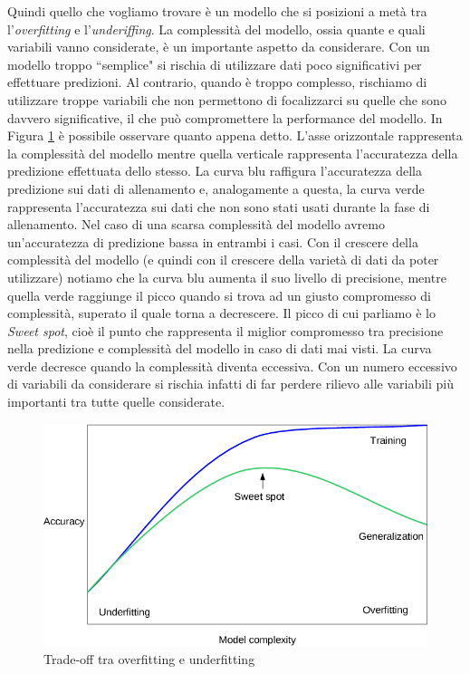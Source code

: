 \documentclass[12pt,italian]{report}
\begin{document}
Quindi quello che vogliamo trovare è un modello che si posizioni a metà tra l'\emph{overfitting} e l'\emph{underiffing}. La complessità del modello, ossia quante e quali variabili vanno considerate, è un importante aspetto da considerare. Con un modello troppo ``semplice" si rischia di utilizzare dati poco significativi per effettuare predizioni. %
Al contrario, quando è troppo complesso, rischiamo di utilizzare troppe variabili che non permettono di focalizzarci su quelle che sono davvero significative, il che può compromettere la performance del modello. In Figura \ref{fig:tradeoff_img} è possibile osservare quanto appena detto. L'asse orizzontale rappresenta la complessità del modello mentre quella verticale rappresenta l'accuratezza della predizione effettuata dello stesso. La curva blu raffigura l'accuratezza della predizione sui dati di allenamento e, analogamente a questa, la curva verde rappresenta l'accuratezza sui dati che non sono stati usati durante la fase di allenamento. Nel caso di una scarsa complessità del modello avremo un'accuratezza di predizione bassa in entrambi i casi. Con il crescere della complessità del modello (e quindi con il crescere della varietà di dati da poter utilizzare) notiamo che la curva blu aumenta il suo livello di precisione, mentre quella verde raggiunge il picco quando si trova ad un giusto compromesso di complessità, superato il quale torna a decrescere. Il picco di cui parliamo è lo \emph{Sweet spot}, cioè il punto che rappresenta il miglior compromesso tra precisione nella predizione e complessità del modello in caso di dati mai visti. La curva verde decresce quando la complessità diventa eccessiva. Con un numero eccessivo di variabili da considerare si rischia infatti di far perdere rilievo alle variabili più importanti tra tutte quelle considerate.%

\begin{figure} [h!]


	\includegraphics[scale=0.5]{../img/tradeoff_overfitting_underfitting.png}
	\caption{Trade-off tra overfitting e underfitting}
	\label{fig:tradeoff_img}
\end{figure}
\end{document}
